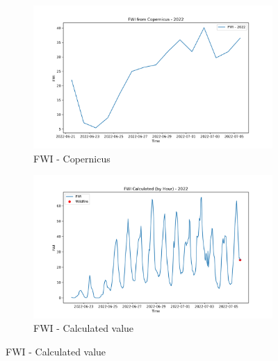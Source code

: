 \begin{figure}[h]
	\caption{Comparison of FWI calculated values and Copernicus at midday - 2022}
	\centering
	\begin{subfigure}{0.49\textwidth}
		\centering
		\includegraphics[width=\textwidth]{graphs/2022/2022CopernicusFWI12.png}
		\caption{FWI - Copernicus}
		\label{fig:fwi_copernicus_2022_midday}
	\end{subfigure}
	\hfill
	\begin{subfigure}{0.49\textwidth}
		\centering
		\includegraphics[width=\textwidth]{graphs/2022/2022CalcFWI12.png}
		\caption{FWI - Calculated value}
		\label{fig:fwi_calculated_2022_midday}
	\end{subfigure}
	\label{fig:comparison_fwi_2022_midday_copernicus_calculated}
\end{figure}

\FloatBarrier


